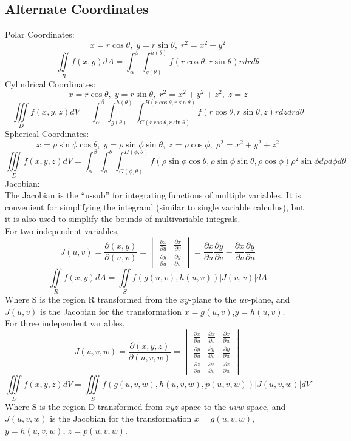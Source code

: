 \documentclass{article}
\begin{document}
\subsection{Alternate Coordinates}
Polar Coordinates:
$$x=r\cos \theta ,\; y=r \sin \theta ,\; r^2 = x^2 + y^2$$
$$\iint\limits_R f(x,y) dA = \int^\beta _\alpha \int^{h(\theta)} _{g( \theta)} f( r \cos \theta , r \sin \theta )r dr d\theta$$
Cylindrical Coordinates:
$$x=r\cos \theta ,\; y=r \sin \theta ,\; r^2 = x^2 + y^2 + z^2, \; z = z$$
$$\iiint\limits_D f(x,y,z) dV = \int^\beta _\alpha \int^{h(\theta)} _{g( \theta)} \int^{H(r\cos \theta, r \sin \theta )}_{G(r \cos \theta , r \sin \theta )} f( r \cos \theta , r \sin \theta, z )r dz dr d\theta$$
Spherical Coordinates:
$$x= \rho \sin \phi \cos \theta ,\; y=\rho \sin \phi \sin \theta ,\; z = \rho \cos \phi , \; \rho^2 = x^2 + y^2 + z^2$$
$$\iiint\limits_D f(x,y,z) dV = \int^\beta _\alpha \int^{b} _{a} \int^{H(\phi, \theta )}_{G(\phi,\theta )} f( \rho \sin \phi \cos \theta , \rho \sin \phi \sin \theta, \rho \cos \phi  ) \rho ^2 \sin \phi  d\rho d \phi d\theta$$
Jacobian:
\\The Jacobian is the ``u-sub'' for integrating functions of multiple variables. It is convenient for simplifying the integrand (similar to single variable calculus), but it is also used to simplify the bounds of multivariable integrals. 
\\For two independent variables,
$$J(u,v) = \frac{\partial (x,y)}{\partial (u,v)}=\begin{vmatrix}
    \frac{\partial x}{\partial u}& \frac{\partial x}{\partial v}  \\
    \frac{\partial y}{\partial u} & \frac{\partial y}{\partial v}  
\end{vmatrix} = \frac{\partial x}{\partial u} \frac{\partial y}{\partial v} - \frac{\partial x}{\partial v} \frac{\partial y}{\partial u} $$
$$\iint\limits_R f(x,y)dA = \iint\limits_S f(g(u,v),h(u,v))|J(u,v)|dA$$
Where S is the region R transformed from the $xy$-plane to the $uv$-plane, and $J(u,v)$ is the Jacobian for the transformation $x=g(u,v)$,$y=h(u,v)$.
\\For three independent variables,
$$J(u,v,w) = \frac{\partial (x,y,z)}{\partial (u,v,w)}=\begin{vmatrix}
    \frac{\partial x}{\partial u}& \frac{\partial x}{\partial v}& \frac{\partial x}{\partial w}  \\
    \frac{\partial y}{\partial u} & \frac{\partial y}{\partial v}& \frac{\partial y}{\partial w} \\
    \frac{\partial z}{\partial u} & \frac{\partial z}{\partial v}& \frac{\partial z}{\partial w}
\end{vmatrix} $$
$$\iiint\limits_D f(x,y,z)dV = \iiint\limits_S f(g(u,v,w),h(u,v,w),p(u,v,w))|J(u,v,w)|dV$$
Where S is the region D transformed from $xyz$-space to the $uvw$-space, and $J(u,v,w)$ is the Jacobian for the transformation $x=g(u,v,w)$, $y=h(u,v,w)$, $z=p(u,v,w)$.
\end{document}
